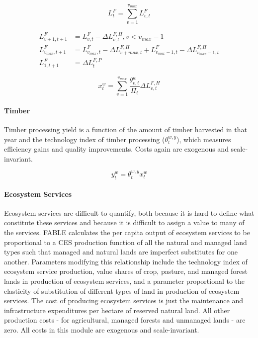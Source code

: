 \documentclass[10pt]{article}
\begin{document}
\begin{equation}
L_t^F = \sum \limits_{v=1}^{v_{max}} L_{v,t}^F
\end{equation}

\begin{subequations}
\begin{align}
L_{v+1, t+1}^F &= L_{v,t}^F - \Delta L_{v,t}^{F,H} , v < v_{max} - 1 \\
L_{v_{max}, t+1}^F &= L_{v_{max}, t}^F - \Delta L_{v+{max}, t}^{F, H} + L_{v_{max}-1, t}^F - \Delta L_{v_{max}-1, t}^{F,H} \\
L_{1, t+1}^F &= \Delta L_t^{F,P}
\end{align}
\end{subequations}

\begin{equation}
x_t^w = \sum \limits_{v=1}^{v_{max}} \dfrac{\theta_{v,t}^w}{\Pi_t} \Delta L_{v,t}^{F,H}
\end{equation}



\paragraph{Timber}

Timber processing yield is a function of the amount of timber harvested in that year and the technology index of timber processing ($\theta_t^{w,y}$), which measures efficiency gains and quality improvements. Costs again are exogenous and scale-invariant. 

\begin{equation}
y_t^w = \theta_t^{w,y} x_t^w
\end{equation}


\paragraph{Ecosystem Services}

Ecosystem services are difficult to quantify, both because it is hard to define what constitute these services and because it is difficult to assign a value to many of the services. FABLE calculates the per capita output of ecosystem services to be proportional to a CES production function of all the natural and managed land types such that managed and natural lands are imperfect substitutes for one another. Parameters modifying this relationship include the technology index of ecosystem service production, value shares of crop, pasture, and managed forest lands in production of ecosystem services, and a parameter proportional to the elasticity of substitution of different types of land in production of ecosystem services. The cost of producing ecosystem services is just the maintenance and infrastructure expenditures per hectare of reserved natural land. All other production costs - for agricultural, managed forests and unmanaged lands - are zero. All costs in this module are exogenous and scale-invariant.  
\end{document}
